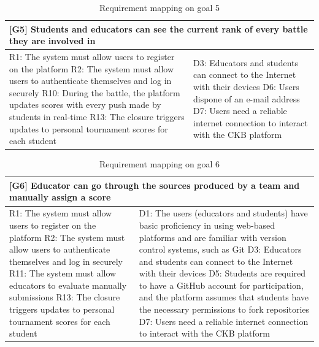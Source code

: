 \begin{table}[H]
    \centering
    \begin{tabular}{|p{8cm}|p{8cm}|}
    \hline
        \multicolumn{2}{|p{16cm}|}{\textbf{[G5] Students and educators can see the current rank of every battle they are involved in}} \\
    \hline
        R1: The system must allow users to register on the platform \newline
        R2: The system must allow users to authenticate themselves and log in securely \newline
        R10: During the battle, the platform updates scores with every push made by students in real-time \newline
        R13: The closure triggers updates to personal tournament scores for each student 
        &
        D3: Educators and students can connect to the Internet with their devices \newline
        D6: Users dispone of an e-mail address \newline
        D7: Users need a reliable internet connection to interact with the CKB platform\\
    \hline
    \end{tabular}
    \caption{Requirement mapping on goal 5}
    \label{tab:g5}
\end{table}
\begin{table}[H]
    \centering
    \begin{tabular}{|p{8cm}|p{8cm}|}
    \hline
        \multicolumn{2}{|p{16cm}|}{\textbf{[G6] Educator can go through the sources produced by a team and manually assign a score}} \\
    \hline
        R1: The system must allow users to register on the platform  \newline
        R2: The system must allow users to authenticate themselves and log in securely \newline
        R11: The system must allow educators to evaluate manually submissions \newline
        R13: The closure triggers updates to personal tournament scores for each student \newline
        &
        D1: The users (educators and students) have basic proficiency in using web-based platforms and are familiar with version control systems, such as Git \newline
        D3: Educators and students can connect to the Internet with their devices \newline
        D5: Students are required to have a GitHub account for participation, and the platform assumes that students have the necessary permissions to fork repositories \newline
        D7: Users need a reliable internet connection to interact with the CKB platform\\
    \hline
    \end{tabular}
    \caption{Requirement mapping on goal 6}
    \label{tab:g6}
\end{table}
